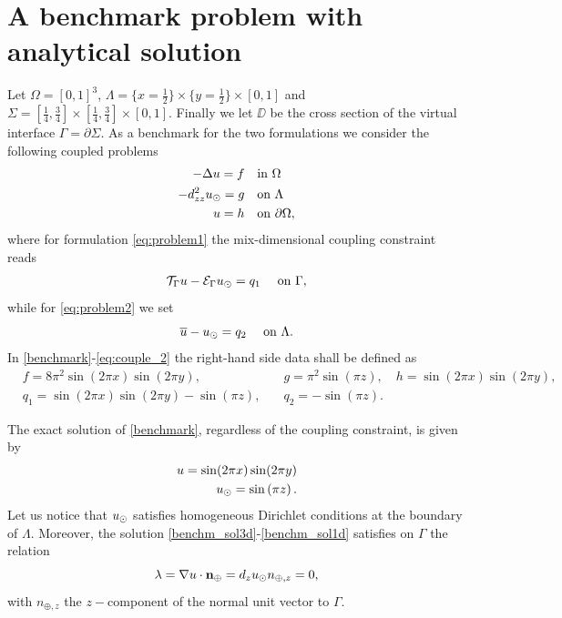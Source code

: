 \section{A benchmark problem with analytical solution}


Let $\Omega=[0,1]^3$, $\Lambda=\{x=\tfrac{1}{2}\}\times \{y=\tfrac{1}{2}\} \times [0,1] $
and $\Sigma=[\tfrac{1}{4}, \tfrac{3}{4}]\times [\tfrac{1}{4}, \tfrac{3}{4}]\times [0, 1]$.
Finally we let $\DD$ be the cross section of the virtual interface $\Gamma=\partial \Sigma$.
As a benchmark for the two formulations we consider the following coupled problems
%
\begin{subequations}\label{benchmark}
\begin{align}
\label{benchm_3d}
-\Delta u=f \quad &\text{in $\Omega$}\\
\label{benchm_1d}
-d_{zz}^2 \ud =g \quad &\text{on $\Lambda$}\\
u=h \quad &\text{on $\partial \Omega$},
\end{align}
\end{subequations}
where for formulation \eqref{eq:problem1} the mix-dimensional coupling constraint reads
\begin{equation}
  \label{eq:couple_1}
\mathcal{T}_{\Gamma}u - \mathcal{E}_{\Gamma}\ud = q_1\quad\text{ on }\Gamma,
\end{equation}
while for \eqref{eq:problem2} we set
\begin{equation}
    \label{eq:couple_2}
\avrc{u} - \ud = q_2\quad\text{ on }\Lambda.
\end{equation}
%
In \eqref{benchmark}-\eqref{eq:couple_2} the right-hand side data shall be defined as 
\begin{eqnarray*}
  &f=8\pi ^2 \sin (2\pi x) \sin (2\pi y),\quad &g={\pi ^2}\sin \left({\pi z}\right),\quad h=\sin (2\pi x) \sin (2\pi y),\\
  &q_1=\sin (2\pi x) \sin (2\pi y) - \sin \left({\pi z}\right),\quad &q_2=-\sin \left({\pi z}\right).
\end{eqnarray*}

The exact solution of \eqref{benchmark}, regardless of the coupling constraint,
is given by
%
\begin{eqnarray}
\label{benchm_sol3d}
u=\sin (2\pi x) \sin (2\pi y)\\
\label{benchm_sol1d}
\ud=\sin \left({\pi z}\right).
\end{eqnarray}
%
Let us notice that $u_{\odot}$ satisfies homogeneous Dirichlet conditions at the boundary of $\Lambda$.
Moreover, the solution \eqref{benchm_sol3d}-\eqref{benchm_sol1d} satisfies on $\Gamma$ the relation
\begin{equation}\label{benchm_flux}
\lambda=\nabla u \cdot \textbf{n}_{\oplus}=d_z \ud n_{\oplus,z}=0,
\end{equation}
with $n_{\oplus,z}$ the $z-$component of the normal unit vector to $\Gamma$.

